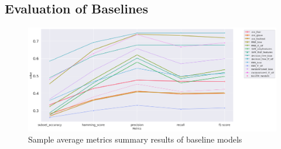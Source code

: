 \subsection{Evaluation of Baselines}
\begin{figure}[h!]
    \centering
    \includegraphics[width=1\textwidth]{thesis/figures/Baslines.png}
    \caption{Sample average metrics summary results of baseline models }
    \label{fig:model_wise_group_baseline}
\end{figure}
